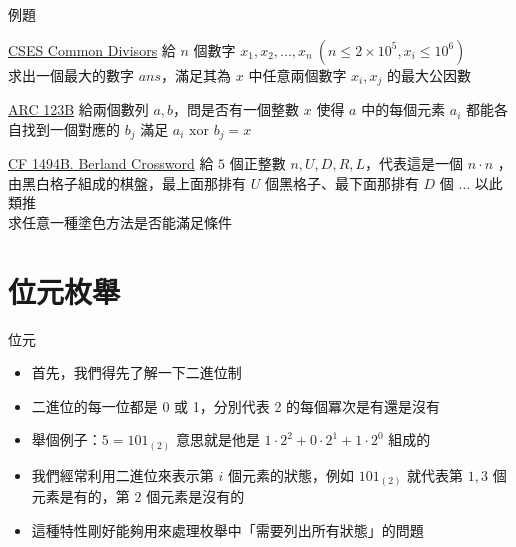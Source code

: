 \documentclass[aspectratio=169]{beamer}
\begin{document}
    \begin{frame}{例題}
        \begin{block}{\href{https://cses.fi/problemset/task/1081}{CSES Common Divisors}}
            給 $n$ 個數字 $x_1, x_2, ..., x_n\ (n \le 2 \times 10^5, x_i \le 10^6)$\\
            求出一個最大的數字 $ans$，滿足其為 $x$ 中任意兩個數字 $x_i, x_j$ 的最大公因數
        \end{block}

        \begin{block}{\href{https://atcoder.jp/contests/arc124/tasks/arc124_b}{ARC 123B}}
            給兩個數列 $a, b$，問是否有一個整數 $x$ 使得 $a$ 中的每個元素 $a_i$ 都能各自找到一個對應的 $b_j$ 滿足 $a_i \text{ xor } b_j = x$
        \end{block}

        \begin{block}{\href{https://codeforces.com/problemset/problem/1494/B}{CF 1494B. Berland Crossword}}
            給 $5$ 個正整數 $n, U, D, R, L$，代表這是一個 $n \cdot n$ ，由黑白格子組成的棋盤，最上面那排有 $U$ 個黑格子、最下面那排有 $D$ 個 $\dots$ 以此類推\\
            求任意一種塗色方法是否能滿足條件
        \end{block}
        
        
    \end{frame}

    \section{位元枚舉}

    \begin{frame}{位元}
        \begin{itemize}
            \item<1-> 首先，我們得先了解一下二進位制
            \item<1-> 二進位的每一位都是 0 或 1，分別代表 2 的每個冪次是有還是沒有
            \item<1-> 舉個例子：$5 = 101_{(2)}$ 意思就是他是 $1 \cdot 2^2 + 0 \cdot 2^1 + 1 \cdot 2^0$ 組成的
            \item<2-> 我們經常利用二進位來表示第 $i$ 個元素的狀態，例如 $101_{(2)}$ 就代表第 $1, 3$ 個元素是有的，第 $2$ 個元素是沒有的
            \item<2-> 這種特性剛好能夠用來處理枚舉中「需要列出所有狀態」的問題
        \end{itemize}
    \end{frame}
\end{document}
